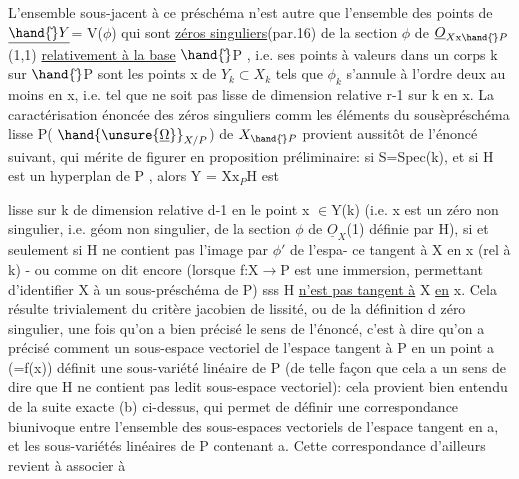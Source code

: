 
\placedmargin{$|$}L'ensemble sous-jacent à ce préschéma n'est autre que l'ensemble des
points de $\underline{\hand{\check{}}Y}$= V($\phi$) qui sont \uline{zéros singuliers}(par.16) de la section $\phi$ de
$\underline{O}_{X\mathrm{x}\hand{\check{}}P}$(1,1) \uline{relativement à la base} $\hand{\check{}}$P , i.e. ses points  à valeurs dans
un corps k sur $\hand{\check{}}$P sont les points x de $Y_k\subset X_k$ tels que 
 $\phi_k$ s'annule à l'ordre deux au moins
en x, i.e. tel que  ne soit pas lisse de dimension relative r-1
sur k en x. La caractérisation énoncée des  zéros singuliers comm
les éléments du sousèpréschéma lisse P( $\hand{\unsure{\underline{\Omega}}}_{X/P}$) de $X_{\hand{\check{}}P}$ provient aussitôt
de l'énoncé suivant, qui mérite de figurer en proposition préliminaire:
si S=Spec(k), et si H est un hyperplan de P , alors Y = X$\mathrm{x}_P$H est

 lisse sur k de
dimension relative d-1 en le point x $\in$Y(k) (i.e. x est un zéro non
singulier, i.e. géom non singulier, de la section $\phi$ de $\underline{O}_X$(1) définie
par H), si et seulement si H ne contient pas l'image par $\phi'$ de l'espa-%
ce tangent à X en x (rel à k) - ou  comme on dit encore
(lorsque f:X$\longrightarrow$P est une immersion, permettant d'identifier X à un
sous-préschéma de P) sss H \uline{n'est pas tangent à} X \uline{en} x. Cela résulte
trivialement du critère jacobien de lissité, ou de la définition d
zéro singulier, une fois qu'on a bien précisé le sens de l'énoncé,
c'est à dire qu'on a précisé comment un  sous-espace
\placedmargin{$|$}vectoriel de l'espace tangent à P en un point a (=f(x)) définit une
sous-variété linéaire de P (de telle façon que cela a un sens de dire
que H ne contient pas ledit sous-espace vectoriel): cela provient
bien entendu de la suite exacte (b) ci-dessus, qui permet de
définir une correspondance biunivoque entre l'ensemble des sous-espaces
vectoriels de l'espace tangent en a, et les sous-variétés linéaires de
P contenant a. Cette correspondance d'ailleurs revient à associer à

